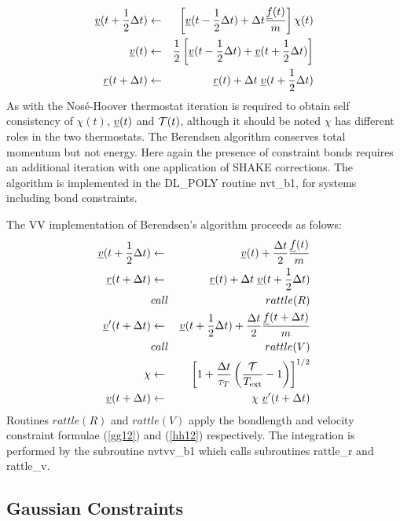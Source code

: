\begin{eqnarray}
\mbox{$\underline{v}$}(t + {1\over 2} \Delta t)&\leftarrow& \left[ \mbox{$\underline{v}$}(t-{1\over 2} \Delta t) +
 \Delta t {\mbox{$\underline{f}$}(t)\over m}\right]\chi(t)\nonumber \\
\mbox{$\underline{v}$}(t)& \leftarrow& {1\over 2} \left[\mbox{$\underline{v}$}(t-{1\over 2}\Delta t)
    +\mbox{$\underline{v}$}(t+{1\over 2}\Delta t)\right]\nonumber\\
\mbox{$\underline{r}$}(t+\Delta t) &\leftarrow& \mbox{$\underline{r}$}(t) + \Delta t\; \mbox{$\underline{v}$}(t+{1\over 2}\Delta t)
\end{eqnarray}
As with the Nos\'e-Hoover thermostat iteration is required to obtain
self consistency of $\chi(t)$, $\mbox{$\underline{v}$}(t)$ and ${\cal T}(t)$,
although it should be noted $\chi$ has different roles in the two
thermostats. The Berendsen algorithm conserves total momentum but not
energy. Here again the presence of constraint bonds requires an
additional iteration with one application of SHAKE corrections.  The
algorithm is implemented in the DL\_POLY routine {\sc nvt\_b1}, for
systems including bond constraints.

The VV implementation of Berendsen's algorithm proceeds as folows:
\begin{eqnarray}
\mbox{$\underline{v}$}(t + {1\over 2} \Delta t)&\leftarrow& \mbox{$\underline{v}$}(t)
+ {\Delta t \over 2} {\mbox{$\underline{f}$}(t)\over m} \nonumber \\
\mbox{$\underline{r}$}(t+\Delta t) &\leftarrow& \mbox{$\underline{r}$}(t) + \Delta t \;
\mbox{$\underline{v}$}(t+{1\over 2}\Delta t)\nonumber \\
&call&rattle(R) \nonumber \\
\mbox{$\underline{v}$}'(t + \Delta t)&\leftarrow& \mbox{$\underline{v}$}(t + {1 \over 2}\Delta t) +
 {\Delta t \over 2} {\mbox{$\underline{f}$}(t + \Delta t)\over m} \nonumber \\
&call&rattle(V) \nonumber \\
\chi &\leftarrow& \left [1+{\Delta t \over \tau_T}\left( {{\cal
T}\over T_{\rm ext}} - 1\right) \right ]^{1/2} \nonumber \\
\mbox{$\underline{v}$}(t + \Delta t)&\leftarrow& \chi~\mbox{$\underline{v}$}'(t + \Delta t)
\end{eqnarray}
Routines $rattle(R)$ and $rattle(V)$ apply the bondlength and velocity
constraint formulae (\ref{gg12}) and (\ref{hh12}) respectively.  The
integration is performed by the subroutine {\sc nvtvv\_b1} which calls
subroutines {\sc rattle\_r} and {\sc rattle\_v}.

\subsection{Gaussian Constraints}

